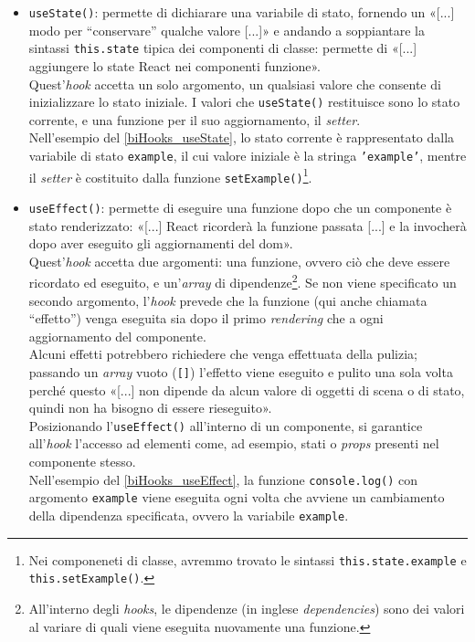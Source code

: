 \begin{itemize}
  \item {\texttt{useState()}}: permette di dichiarare una variabile di stato, fornendo un «[...] modo per “conservare” qualche valore [...]»\cite{React_UsareHookState} e andando a soppiantare la sintassi \texttt{this.state} tipica dei componenti di classe: permette di «[...] aggiungere lo state React nei componenti funzione»\cite{React_UsareHookState}.\\
  Quest'\textit{hook} accetta un solo argomento, un qualsiasi valore che consente di inizializzare lo stato iniziale. I valori che \texttt{useState()} restituisce sono lo stato corrente, e una funzione per il suo aggiornamento, il \textit{setter}.\\
  Nell'esempio del \autoref{biHooks_useState}, lo stato corrente è rappresentato dalla variabile di stato \texttt{example}, il cui valore iniziale è la stringa \texttt{'example'}, mentre il \textit{setter} è costituito dalla funzione \texttt{setExample()}\footnote{Nei componeneti di classe, avremmo trovato le sintassi \texttt{this.state.example} e \texttt{this.setExample()}.}.
  
  

  \item {\texttt{useEffect()}}: permette di eseguire una funzione dopo che un componente è stato renderizzato:
  «[...] React ricorderà la funzione passata [...] e la invocherà dopo aver eseguito gli aggiornamenti del \gls{dom}»\cite{React_UsareHookEffect_Example}.\\
  Quest'\textit{hook} accetta due argomenti: una funzione, ovvero ciò che deve essere ricordato ed eseguito, e un'\textit{array} di dipendenze\footnote{All'interno degli \textit{hooks}, le dipendenze (in inglese \textit{dependencies}\label{dependencies}) sono dei valori al variare di quali viene eseguita nuovamente una funzione.}.
  Se non viene specificato un secondo argomento, l'\textit{hook} prevede che la funzione (qui anche chiamata “effetto”) venga eseguita sia dopo il primo \textit{rendering} che a ogni aggiornamento del componente.\\
  Alcuni effetti potrebbero richiedere che venga effettuata della pulizia; passando un \textit{array} vuoto (\texttt{[]}) l'effetto viene eseguito e pulito una sola volta perché questo «[...] non dipende da alcun valore di oggetti di scena o di stato, quindi non ha bisogno di essere rieseguito»\cite{React_UsareHookEffect_Tip}.\\ 
  Posizionando l'\texttt{useEffect()} all'interno di un componente, si garantice all'\textit{hook} l'accesso ad elementi come, ad esempio, stati o \textit{props} presenti nel componente stesso.\\ 
  Nell'esempio del \autoref{biHooks_useEffect}, la funzione \texttt{console.log()} con argomento \texttt{example} viene eseguita ogni volta che avviene un cambiamento della dipendenza specificata, ovvero la variabile \texttt{example}.
  

\end{itemize}

